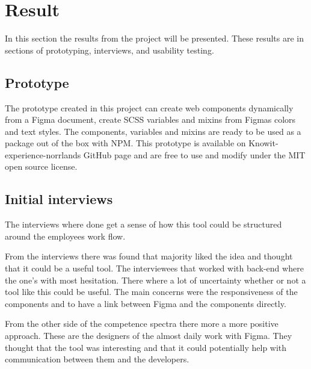 \section{Result}


In this section the results from the project will be presented. These results are in sections of prototyping, interviews, and usability testing.

\subsection{Prototype}%
\label{sub:Prototype}
The prototype created in this project can create web components dynamically from a Figma document, create SCSS variables and mixins from Figmas colors and text styles. The components, variables and mixins are ready to be used as a package out of the box with NPM. This prototype is available on Knowit-experience-norrlands GitHub page and are free to use and modify under the MIT open source license.

\subsection{Initial interviews}%
\label{sub:Initial interviews}
The interviews where done get a sense of how this tool could be structured around the employees work flow.

From the interviews there was found that majority liked the idea and thought that it could be a useful tool. The interviewees that worked with back-end where the one's with most hesitation. There where a lot of uncertainty whether or not a tool like this could be useful. The main concerns were the responsiveness of the components and to have a link between Figma and the components directly.

From the other side of the competence spectra there more a more positive approach. These are the designers of the almost daily work with Figma. They thought that the tool was interesting and that it could potentially help with communication between them and the developers.


